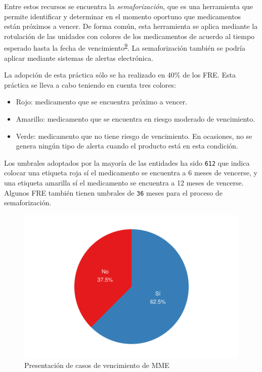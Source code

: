 \documentclass[
]{book}
\providecommand{\tightlist}{%
  \setlength{\itemsep}{0pt}\setlength{\parskip}{0pt}}
\begin{document}
Entre estos recursos se encuentra la \emph{semaforización}, que es una herramienta que permite identificar y determinar en el momento oportuno que medicamentos están próximos a vencer. De forma común, esta herramienta se aplica mediante la rotulación de las unidades con colores de los medicamentos de acuerdo al tiempo esperado hasta la fecha de vencimiento\textsuperscript{\protect\hyperlink{ref-HernandezVera2017}{9}}. La semaforización también se podría aplicar mediante sistemas de alertas electrónica.

La adopción de esta práctica sólo se ha realizado en 40\% de los FRE. Esta práctica se lleva a cabo teniendo en cuenta tres colores:

\begin{itemize}
\tightlist
\item
  Rojo: medicamento que se encuentra próximo a vencer.
\item
  Amarillo: medicamento que se encuentra en riesgo moderado de vencimiento.
\item
  Verde: medicamento que no tiene riesgo de vencimiento. En ocasiones, no se genera ningún tipo de alerta cuando el producto está en esta condición.
\end{itemize}

Los umbrales adoptados por la mayoría de las entidades ha sido \texttt{6\textbar{}12} que indica colocar una etiqueta roja sí el medicamento se encuentra a 6 meses de vencerse, y una etiqueta amarilla sí el medicamento se encuentra a 12 meses de vencerse. Algunos FRE también tienen umbrales de \texttt{3\textbar{}6} meses para el proceso de semaforización.

\begin{figure}
\includegraphics[width=0.85\linewidth]{InformeFinal_files/figure-latex/CasosVencimiento1-1} \caption{Presentación de casos de vencimiento de MME}\label{fig:CasosVencimiento1}
\end{figure}
\end{document}
